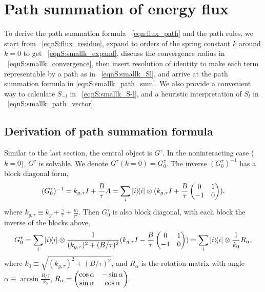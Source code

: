 \documentclass[
 amsmath,amssymb,
 aps,
 pre,
 longbibliography,
 10pt, onecolumn,
 notitlepage
]{revtex4-1}
\begin{document}
\section{Path summation of energy flux}
To derive the path summation formula \eqnname~\eqref{eqn:flux_path} and the path rules, we start from \eqnname~\eqref{eqnS:flux_residue}, expand to orders of the spring constant $k$ around $k=0$ to get \eqnname~\eqref{eqnS:smallk_expand}, discuss the convergence radius in \eqnname~\eqref{eqnS:smallk_convergence}, then insert resolution of identity to make each term representable by a path as in \eqnname~\eqref{eqnS:smallk_Sl}, and arrive at the path summation formula in \eqref{eqnS:smallk_path_sum}.
We also provide a convenient way to calculate $S_{-l}$ in \eqnname~\eqref{eqnS:smallk_S-l}, and a heuristic interpretation of $S_l$ in \eqnname~\eqref{eqnS:smallk_path_vector}.

\subsection{Derivation of path summation formula}
Similar to the last section, the central object is $G^\tau$.
In the noninteracting case ($k=0$), $G^\tau$ is solvable. We denote $G^\tau(k=0) = G^\tau_0$.
The inverse $(G^\tau_0)^{-1}$ has a block diagonal form,
\begin{equation}
    (G^\tau_0)^{-1} = k_{g,\tau} I + \frac{B}{\tau}A
    = \sum_i \ketbra{i}{i} \otimes (k_{g,\tau}I + \frac{B}{\tau} \pmqty{0 & 1 \\ -1 & 0}).
\end{equation}
where $k_{g,\tau} \equiv k_g + \frac{\gamma}{\tau} + \frac{m}{\tau^2}$.
Then $G^\tau_0$ is also block diagonal, with each block the inverse of the blocks above,
\begin{equation} \label{eqnS:smallk_Gtau0}
    G^\tau_0 = \sum_i \ketbra{i}{i} \otimes \frac{1}{(k_{g,\tau})^2 + (B/\tau)^2}(k_{g,\tau} I - \frac{B}{\tau} \pmqty{0 & 1 \\ -1 & 0})
    = \sum_i \ketbra{i}{i} \otimes \frac{1}{k_0}R_\alpha,
\end{equation}
where $k_0 \equiv \sqrt{(k_{g,\tau})^2 + (B/\tau)^2}$, and $R_\alpha$ is the rotation matrix with angle $\alpha \equiv \arcsin{\frac{B/\tau}{k_0}}$, $R_\alpha = \pmqty{\cos\alpha & -\sin\alpha \\ \sin\alpha & \cos\alpha}$.
\end{document}
